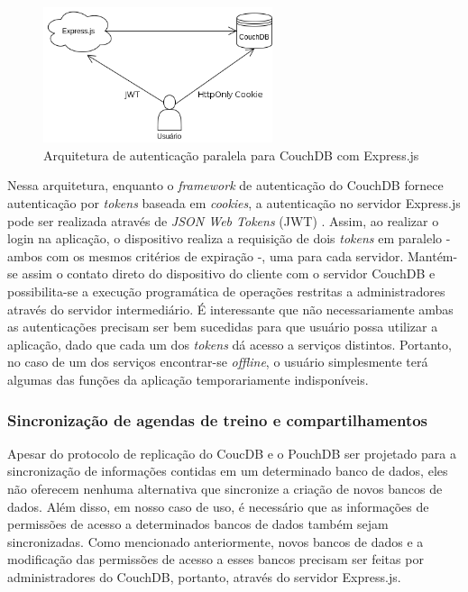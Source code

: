 \documentclass[
	article,			%
	11pt,				%
	oneside,			%
	a4paper,			%
	english,			%
	brazil,				%
	sumario=tradicional
	]{abntex2}
\begin{document}
\begin{figure}[H]
	\centering
	\caption{Arquitetura de autenticação paralela para CouchDB com Express.js}
	\includegraphics[width=0.6\textwidth]{figures/couchdb-express-proxy-scheme-update}
\end{figure}

Nessa arquitetura, enquanto o \textit{framework} de autenticação do CouchDB fornece autenticação por \textit{tokens} baseada em \textit{cookies}, a autenticação no servidor Express.js pode ser realizada através de \textit{JSON Web Tokens} (JWT) \cite{jwt-2017}. Assim, ao realizar o login na aplicação, o dispositivo realiza a requisição de dois \textit{tokens} em paralelo - ambos com os mesmos critérios de expiração -, uma para cada servidor. Mantém-se assim o contato direto do dispositivo do cliente com o servidor CouchDB e possibilita-se a execução programática de operações restritas a administradores através do servidor intermediário. É interessante que não necessariamente ambas as autenticações precisam ser bem sucedidas para que usuário possa utilizar a aplicação, dado que cada um dos \textit{tokens} dá acesso a serviços distintos. Portanto, no caso de um dos serviços encontrar-se \textit{offline}, o usuário simplesmente terá algumas das funções da aplicação temporariamente indisponíveis.

\subsubsection{Sincronização de agendas de treino e compartilhamentos}

Apesar do protocolo de replicação do CoucDB e o PouchDB ser projetado para a sincronização de informações contidas em um determinado banco de dados, eles não oferecem nenhuma alternativa que sincronize a criação de novos bancos de dados. Além disso, em nosso caso de uso, é necessário que as informações de permissões de acesso a determinados bancos de dados também sejam sincronizadas. Como mencionado anteriormente, novos bancos de dados e a modificação das permissões de acesso a esses bancos precisam ser feitas por administradores do CouchDB, portanto, através do servidor Express.js.
\end{document}

